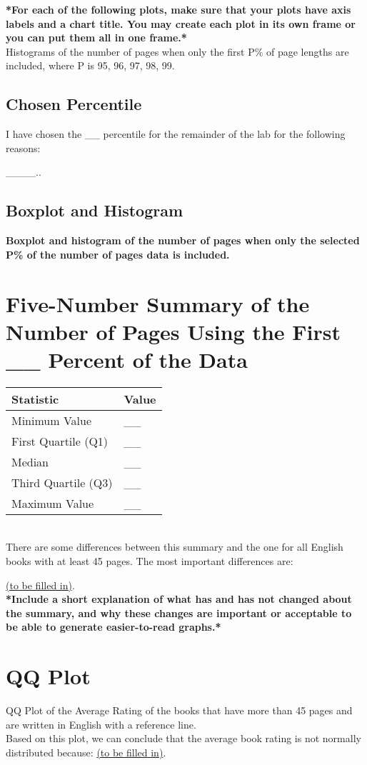 \documentclass[12pt]{article}
\begin{document}
\textbf{*For each of the following plots, make sure that your plots have axis labels and a chart title. You may create each plot in its own frame or you can put them all in one frame.*}\\

{Histograms of the number of pages when only the first P\% of page lengths are included, where P is 95, 96, 97, 98, 99.}

\subsection*{Chosen Percentile}
I have chosen the \_\_ percentile for the remainder of the lab for the following reasons:

\_\_\_\_..

\subsection*{Boxplot and Histogram}
\textbf{Boxplot and histogram of the number of pages when only the selected P\% of the number of pages data is included.}

\section*{Five-Number Summary of the Number of Pages Using the First \_\_ Percent of the Data}
\begin{tabular}{l l}
    \toprule
    \textbf{Statistic} & \textbf{Value} \\
    \midrule
    Minimum Value & \_\_ \\
    First Quartile (Q1) & \_\_ \\
    Median & \_\_ \\
    Third Quartile (Q3) & \_\_ \\
    Maximum Value & \_\_ \\
    \bottomrule
\end{tabular}\\

{There are some differences between this summary and the one for all English books with at least 45 pages. The most important differences are:} 

\underline{(to be filled in)}.\\

\textbf{*Include a short explanation of what has and has not changed about the summary, and why these changes are important or acceptable to be able to generate easier-to-read graphs.*}

\section*{QQ Plot}
{QQ Plot of the Average Rating of the books that have more than 45 pages and are written in English with a reference line.}\\

{Based on this plot, we can conclude that the average book rating is not normally distributed because:} \underline{(to be filled in)}.
\end{document}
